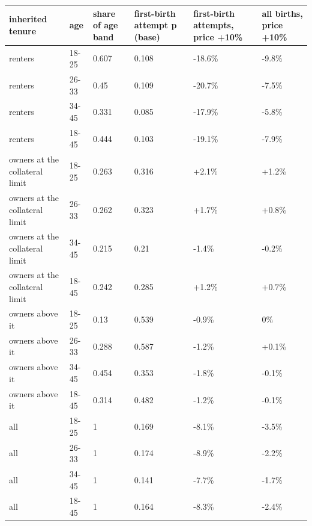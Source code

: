 \begingroup\small
\setlength{\tabcolsep}{3pt}
\renewcommand{\arraystretch}{1.04}
\begin{tabularx}{\linewidth}{XXXXXX}
\toprule
inherited tenure & age & share of age band & first-birth attempt p (base) & first-birth attempts, price +10\% & all births, price +10\% \\
\midrule
renters & 18-25 & 0.607 & 0.108 & -18.6\% & -9.8\% \\
renters & 26-33 & 0.45 & 0.109 & -20.7\% & -7.5\% \\
renters & 34-45 & 0.331 & 0.085 & -17.9\% & -5.8\% \\
renters & 18-45 & 0.444 & 0.103 & -19.1\% & -7.9\% \\
owners at the collateral limit & 18-25 & 0.263 & 0.316 & +2.1\% & +1.2\% \\
owners at the collateral limit & 26-33 & 0.262 & 0.323 & +1.7\% & +0.8\% \\
owners at the collateral limit & 34-45 & 0.215 & 0.21 & -1.4\% & -0.2\% \\
owners at the collateral limit & 18-45 & 0.242 & 0.285 & +1.2\% & +0.7\% \\
owners above it & 18-25 & 0.13 & 0.539 & -0.9\% & 0\% \\
owners above it & 26-33 & 0.288 & 0.587 & -1.2\% & +0.1\% \\
owners above it & 34-45 & 0.454 & 0.353 & -1.8\% & -0.1\% \\
owners above it & 18-45 & 0.314 & 0.482 & -1.2\% & -0.1\% \\
all & 18-25 & 1 & 0.169 & -8.1\% & -3.5\% \\
all & 26-33 & 1 & 0.174 & -8.9\% & -2.2\% \\
all & 34-45 & 1 & 0.141 & -7.7\% & -1.7\% \\
all & 18-45 & 1 & 0.164 & -8.3\% & -2.4\% \\
\bottomrule
\end{tabularx}
\endgroup
